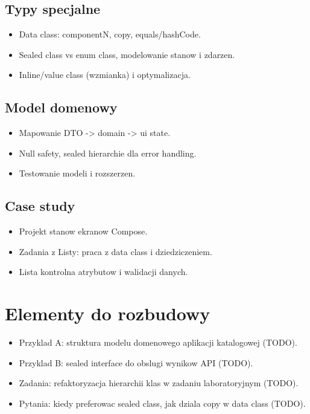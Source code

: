 \subsection{Typy specjalne}
\begin{itemize}
  \item Data class: componentN, copy, equals/hashCode.
  \item Sealed class vs enum class, modelowanie stanow i zdarzen.
  \item Inline/value class (wzmianka) i optymalizacja.
\end{itemize}

\subsection{Model domenowy}
\begin{itemize}
  \item Mapowanie DTO -> domain -> ui state.
  \item Null safety, sealed hierarchie dla error handling.
  \item Testowanie modeli i rozszerzen.
\end{itemize}

\subsection{Case study}
\begin{itemize}
  \item Projekt stanow ekranow Compose.
  \item Zadania z Listy: praca z data class i dziedziczeniem.
  \item Lista kontrolna atrybutow i walidacji danych.
\end{itemize}

\section{Elementy do rozbudowy}
\begin{itemize}
  \item Przyklad A: struktura modelu domenowego aplikacji katalogowej (TODO).
  \item Przyklad B: sealed interface do obslugi wynikow API (TODO).
  \item Zadania: refaktoryzacja hierarchii klas w zadaniu laboratoryjnym (TODO).
  \item Pytania: kiedy preferowac sealed class, jak dziala copy w data class (TODO).
\end{itemize}


